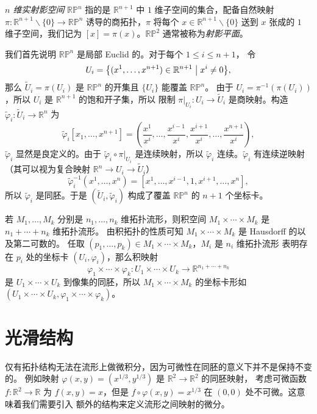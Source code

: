 \begin{example}[射影空间]
  \emph{$n$ 维实射影空间} $\mathbb{RP}^n$ 指的是 $\mathbb{R}^{n+1}$
  中 $1$ 维子空间的集合，配备自然映射 $\pi:\mathbb{R}^{n+1}\smallsetminus\{0\}\to\mathbb{RP}^n$
  诱导的商拓扑，$\pi$ 将每个 $x\in\mathbb{R}^{n+1}\smallsetminus\{0\}$ 送到
  $x$ 张成的 $1$ 维子空间，我们记为 $[x]=\pi(x)$。$\mathbb{RP}^2$ 通常被称为\emph{射影平面}。

  我们首先说明 $\mathbb{RP}^n$ 是局部 Euclid 的。对于每个 $1\leq i\le n+1$，
  令
  \[
    U_i=\bigl\{(x^1,\dots,x^{n+1})\in\mathbb{R}^{n+1}\bigm| x^i\neq 0\bigr\}  ,
  \]
  那么 $\tilde{U}_i=\pi(U_i)$ 是 $\mathbb{RP}^n$ 的开集且 $\{U_i\}$ 能覆盖 $\mathbb{RP}^n$。
  由于 $U_i=\pi^{-1}(\pi(U_i))$，所以 $U_i$ 是 $\mathbb{R}^{n+1}$ 的饱和开子集，所以
  限制 $\pi|_{U_i}:U_i\to \tilde{U}_i$ 是商映射。构造 $\tilde\varphi_i:\tilde U_i\to\mathbb{R}^n$
  为
  \[
    \tilde\varphi_i[x_1,\dots,x^{n+1}]=\left(\frac{x^1}{x^i},\dots,\frac{x^{i-1}}{x^i},\frac{x^{i+1}}{x^i},\dots,\frac{x^{n+1}}{x^i}\right)  ,
  \]
  $\tilde\varphi_i$ 显然是良定义的。由于 $\tilde\varphi_i\circ\pi|_{U_i}$
  是连续映射，所以 $\tilde\varphi_i$ 连续。$\tilde\varphi_i$
  有连续逆映射（其可以视为复合映射 $\mathbb{R}^n\to U_i\to\tilde U_i$）
  \[
    \tilde\varphi_i^{-1}(x^1,\dots,x^n)=[x^1,\dots,x^{i-1},1,x^{i+1},\dots,x^n],
  \]
  所以 $\tilde\varphi_i$ 是同胚。于是 $(\tilde U_i,\tilde\varphi_i)$ 构成了覆盖 $\mathbb{RP}^n$ 的
  $n+1$ 个坐标卡。
\end{example}

\begin{example}[积流形]
  若 $M_1,\dots,M_k$ 分别是 $n_1,\dots,n_k$ 维拓扑流形，则积空间
  $M_1\times\cdots\times M_k$ 是 $n_1+\cdots+n_k$ 维拓扑流形。
  由积拓扑的性质可知 $M_1\times\cdots\times M_k$ 是 Hausdorff 的以及第二可数的。
  任取 $(p_1,\dots,p_k)\in M_1\times\cdots\times M_k$，$M_i$ 是 $n_i$ 维拓扑流形
  表明存在 $p_i$ 处的坐标卡 $(U_i,\varphi_i)$，那么积映射
  \[
    \varphi_1\times\cdots\times\varphi_k:U_1\times\cdots\times U_k\to\mathbb{R}^{n_1+\cdots+ n_k}  
  \]
  是 $U_1\times\cdots\times U_k$ 到像集的同胚，所以 $M_1\times\cdots\times M_k$
  的坐标卡形如 $(U_1\times\cdots\times U_k,\varphi_1\times\cdots\times \varphi_k)$。
\end{example}

\section{光滑结构}

仅有拓扑结构无法在流形上做微积分，因为可微性在同胚的意义下并不是保持不变的。
例如映射 $\varphi(x,y)=(x^{1/3},y^{1/3})$ 是 $\mathbb{R}^2\to\mathbb{R}^2$ 的同胚映射，
考虑可微函数 $f:\mathbb{R}^2\to\mathbb{R}$ 为 $f(x,y)=x$，但是
$f\circ\varphi(x,y)=x^{1/3}$ 在 $(0,0)$ 处不可微。这意味着我们需要引入
额外的结构来定义流形之间映射的微分。


